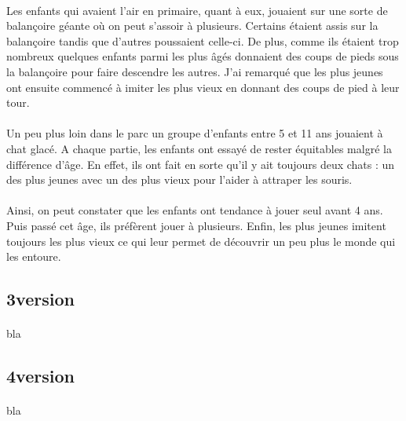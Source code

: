 \paragraph{}
Les enfants qui avaient l’air en primaire, quant à eux, jouaient sur une sorte de balançoire géante où on peut s’assoir à plusieurs. Certains étaient assis sur la balançoire tandis que d’autres poussaient celle-ci. De plus, comme ils étaient trop nombreux quelques enfants parmi les plus âgés donnaient des coups de pieds sous la balançoire pour faire descendre les autres. J’ai remarqué que les plus jeunes ont ensuite commencé à imiter les plus vieux en donnant des coups de pied à leur tour. 
\paragraph{}
Un peu plus loin dans le parc un groupe d’enfants entre 5 et 11 ans jouaient à chat glacé. A chaque partie, les enfants ont essayé de rester équitables malgré la différence d’âge. En effet, ils ont fait en sorte qu’il y ait toujours deux chats : un des plus jeunes avec un des plus vieux pour l’aider à attraper les souris.
\paragraph{}
Ainsi, on peut constater que les enfants ont tendance à jouer seul avant 4 ans. Puis passé cet âge, ils préfèrent jouer à plusieurs. Enfin, les plus jeunes imitent toujours les plus vieux ce qui leur permet de découvrir un peu plus le monde qui les entoure. 

\subsection{3\ieme version}
\paragraph{}
bla

\subsection{4\ieme version}
\paragraph{}
bla
